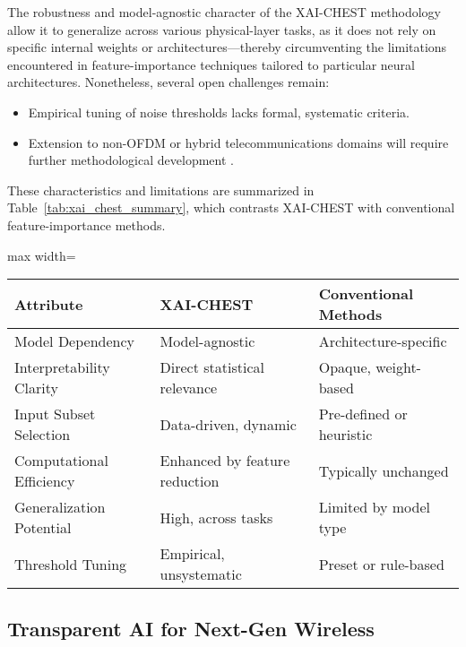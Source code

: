 The robustness and model-agnostic character of the XAI-CHEST methodology allow it to generalize across various physical-layer tasks, as it does not rely on specific internal weights or architectures—thereby circumventing the limitations encountered in feature-importance techniques tailored to particular neural architectures. Nonetheless, several open challenges remain:

\begin{itemize}
    \item Empirical tuning of noise thresholds lacks formal, systematic criteria.
    \item Extension to non-OFDM or hybrid telecommunications domains will require further methodological development \cite{ref38}.
\end{itemize}

These characteristics and limitations are summarized in Table~\ref{tab:xai_chest_summary}, which contrasts XAI-CHEST with conventional feature-importance methods.

\begin{table*}[htbp]
\centering
\caption{Comparison of XAI-CHEST and Conventional Feature-Importance Methods}
\label{tab:xai_chest_summary}
\begin{adjustbox}{max width=\textwidth}
\begin{tabular}{lll}
\toprule
\textbf{Attribute} & \textbf{XAI-CHEST} & \textbf{Conventional Methods} \\
\midrule
Model Dependency & Model-agnostic & Architecture-specific \\
Interpretability Clarity & Direct statistical relevance & Opaque, weight-based \\
Input Subset Selection & Data-driven, dynamic & Pre-defined or heuristic \\
Computational Efficiency & Enhanced by feature reduction & Typically unchanged \\
Generalization Potential & High, across tasks & Limited by model type \\
Threshold Tuning & Empirical, unsystematic & Preset or rule-based \\
\bottomrule
\end{tabular}
\end{adjustbox}
\end{table*}

\subsection{Transparent AI for Next-Gen Wireless}

